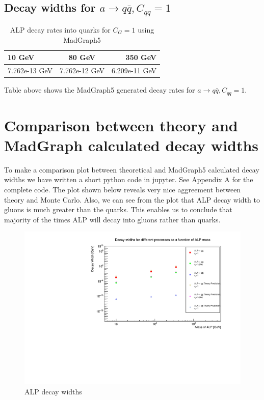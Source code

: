 \documentclass[12pt,a4paper]{article}
\begin{document}
\subsection{Decay widths for $a \rightarrow q \bar{q}, C_{qq} = 1$}
\begin{table}[h!]
\begin{center}
\label{tab : table7}
\begin{tabular}{l|c|r}
\hline
\textbf{10 GeV} & \textbf{80 GeV} & \textbf{350 GeV} \\
\hline
7.762e-13 GeV & 7.762e-12 GeV  & 6.209e-11 GeV \\
\hline
\end{tabular}
\caption{ALP decay rates into quarks for $C_G = 1$ using MadGraph5}
\end{center}
\end{table}

Table above shows the MadGraph5 generated decay rates for $a \rightarrow q \bar{q}, C_{qq} = 1$. 

\section{Comparison between theory and MadGraph calculated decay widths}
To make a comparison plot between theoretical and MadGraph5 calculated decay widths we have written a short python code in jupyter. See Appendix A for the complete code. The plot shown below reveals very nice aggreement between theory and Monte Carlo. Also, we can see from the plot that ALP decay width to gluons is much greater than the quarks. This enables us to conclude that majority of the times ALP will decay into gluons rather than quarks. 

\begin{figure}[h!]
\includegraphics[scale=0.7]{WidthsummaryPlot.pdf}
\caption{ALP decay widths}
\label{fig: figure1}
\end{figure}
\end{document}
